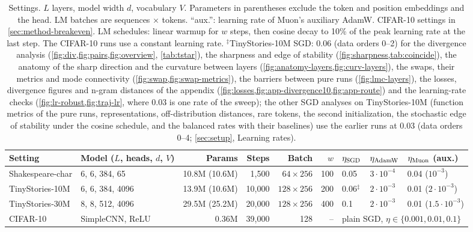 \documentclass[10pt]{article}
\begin{document}
\begin{table}[t]
\centering\small
\caption{Settings. $L$ layers, model width $d$, vocabulary $V$. Parameters in parentheses exclude the token
and position embeddings and the head. LM batches are sequences $\times$ tokens. ``aux.'': learning rate of
Muon's auxiliary AdamW. CIFAR-10 settings in \cref{sec:method-breakeven}. LM schedules: linear warmup for $w$ steps, then cosine decay to
10\% of the peak learning rate at the last step. The CIFAR-10 runs use a constant learning rate.
$^\ddagger$TinyStories-10M SGD: 0.06 (data orders 0--2) for the divergence analysis
(\cref{fig:div,fig:pairs,fig:overview}, \cref{tab:tstar}), the sharpness and edge of stability
(\cref{fig:sharpness,tab:coincide}), the anatomy of the sharp direction and the curvature between layers
(\cref{fig:anatomy-layers,fig:curv-layers}), the swaps, their metrics and mode connectivity
(\cref{fig:swap,fig:swap-metrics}), the barriers between pure runs (\cref{fig:lmc-layers}), the losses, divergence
figures and n-gram distances of the appendix (\cref{fig:losses,fig:app-divergence10,fig:app-route}) and the
learning-rate checks (\cref{fig:lr-robust,fig:traj-lr}, where 0.03 is one rate of the sweep); the other SGD
analyses on TinyStories-10M (function metrics of the pure runs, representations, off-distribution distances, rare
tokens, the second initialization, the stochastic edge of stability under the cosine schedule, and the balanced
rates with their baselines) use the earlier runs at 0.03 (data orders 0--4; \cref{sec:setup}, Learning rates).}
\label{tab:setup}
\setlength{\tabcolsep}{4.5pt}
\begin{tabular}{@{}llrrrrlll@{}}
\toprule
Setting & Model ($L$, heads, $d$, $V$) & Params & Steps & Batch & $w$ & $\eta_{\rm SGD}$ & $\eta_{\rm AdamW}$ & $\eta_{\rm Muon}$ (aux.) \\
\midrule
Shakespeare-char & 6, 6, 384, 65 & 10.8M (10.6M) & 1{,}500 & $64\times256$ & 100 & 0.05 & $3\cdot10^{-4}$ & 0.04 ($10^{-3}$) \\
TinyStories-10M & 6, 6, 384, 4096 & 13.9M (10.6M) & 10{,}000 & $128\times256$ & 200 & 0.06$^\ddagger$ & $2\cdot10^{-3}$ & 0.01 ($2\cdot10^{-3}$) \\
TinyStories-30M & 8, 8, 512, 4096 & 29.5M (25.2M) & 20{,}000 & $128\times256$ & 400 & 0.1 & $2\cdot10^{-3}$ & 0.01 ($1.5\cdot10^{-3}$) \\
CIFAR-10 & SimpleCNN, ReLU & 0.36M & 39{,}000 & 128 & -- & \multicolumn{3}{l}{plain SGD, $\eta\in\{0.001,0.01,0.1\}$} \\
\bottomrule
\end{tabular}
\end{table}
\end{document}
